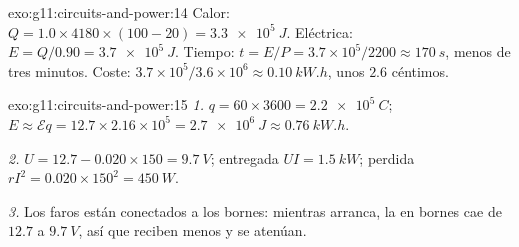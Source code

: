 \begin{solution}{exo:g11:circuits-and-power:14}
Calor: $Q = 1.0 \times 4180 \times (100 - 20) = \qty{3.3e5}{J}$.
Eléctrica: $E = Q/0.90 = \qty{3.7e5}{J}$. Tiempo:
$t = E/P = 3.7\times10^{5}/2200 \approx \qty{170}{s}$, menos de tres
minutos. Coste:
$3.7\times10^{5}/3.6\times10^{6} \approx \qty{0.10}{kW.h}$, unos $2.6$
céntimos.
\end{solution}

\begin{solution}{exo:g11:circuits-and-power:15}
\emph{1.} $q = 60 \times 3600 = \qty{2.2e5}{C}$;
$E \approx \mathcal{E}q = 12.7 \times 2.16\times10^{5} = \qty{2.7e6}{J}
\approx \qty{0.76}{kW.h}$.

\emph{2.} $U = 12.7 - 0.020 \times 150 = \qty{9.7}{V}$; entregada
$UI = \qty{1.5}{kW}$; perdida
$rI^2 = 0.020 \times 150^2 = \qty{450}{W}$.

\emph{3.} Los faros están conectados a los bornes: mientras arranca, la
 en bornes cae de $12.7$ a $\qty{9.7}{V}$, así que reciben menos
 y se atenúan.
\end{solution}

